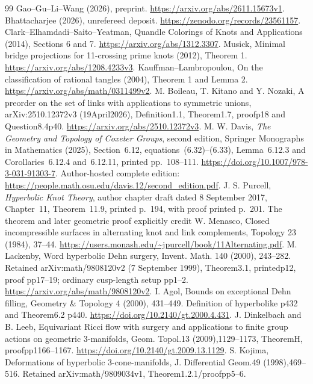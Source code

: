 \documentclass[11pt]{article}
\begin{document}
{\begin{thebibliography}{99}
 Gao--Gu--Li--Wang (2026), preprint.
\url{https://arxiv.org/abs/2611.15673v1}.
 Bhattacharjee (2026), unrefereed deposit.
\url{https://zenodo.org/records/23561157}.
 Clark--Elhamdadi--Saito--Yeatman, Quandle Colorings of
Knots and Applications (2014), Sections 6 and 7.
\url{https://arxiv.org/abs/1312.3307}.
 Musick, Minimal bridge projections for 11-crossing
prime knots (2012), Theorem 1. \url{https://arxiv.org/abs/1208.4233v3}.
 Kauffman--Lambropoulou, On the classification of rational
tangles (2004), Theorem 1 and Lemma 2.
\url{https://arxiv.org/abs/math/0311499v2}.
 M. Boileau, T. Kitano and Y. Nozaki,
A preorder on the set of links with applications to symmetric unions,
arXiv:2510.12372v3 (19April2026), Definition1.1, Theorem1.7,
proofp18 and Question8.4p40.
\url{https://arxiv.org/abs/2510.12372v3}.
 M. W. Davis, \emph{The Geometry and Topology of
Coxeter Groups}, second edition, Springer Monographs in Mathematics
(2025), Section~6.12, equations~(6.32)--(6.33), Lemma~6.12.3 and
Corollaries~6.12.4 and~6.12.11, printed pp.~108--111.
\url{https://doi.org/10.1007/978-3-031-91303-7}.
Author-hosted complete edition:
\url{https://people.math.osu.edu/davis.12/second_edition.pdf}.
 J. S. Purcell, \emph{Hyperbolic Knot Theory},
author chapter draft dated 8 September 2017, Chapter~11,
Theorem~11.9, printed p.~194, with proof printed p.~201.
The theorem and later geometric proof explicitly credit
W. Menasco, Closed incompressible surfaces in alternating knot
and link complements, Topology 23 (1984), 37--44.
\url{https://users.monash.edu/~jpurcell/book/11Alternating.pdf}.
 M. Lackenby, Word hyperbolic Dehn surgery,
Invent. Math. 140 (2000), 243--282.
Retained arXiv:math/9808120v2 (7 September 1999), Theorem3.1,
printedp12, proof pp17--19; ordinary cusp-length setup pp1--2.
\url{https://arxiv.org/abs/math/9808120v2}.
 I. Agol, Bounds on exceptional Dehn filling,
Geometry \& Topology 4 (2000), 431--449.
Definition of hyperbolike p432 and Theorem6.2 p440.
\url{https://doi.org/10.2140/gt.2000.4.431}.
 J. Dinkelbach and B. Leeb, Equivariant Ricci flow
with surgery and applications to finite group actions on geometric
3-manifolds, Geom. Topol.13 (2009),1129--1173, TheoremH,
proofpp1166--1167. \url{https://doi.org/10.2140/gt.2009.13.1129}.
 S. Kojima, Deformations of hyperbolic 3-cone-manifolds,
J. Differential Geom.49 (1998),469--516. Retained
arXiv:math/9809034v1, Theorem1.2.1/proofpp5--6.

\end{thebibliography}}
\end{document}
